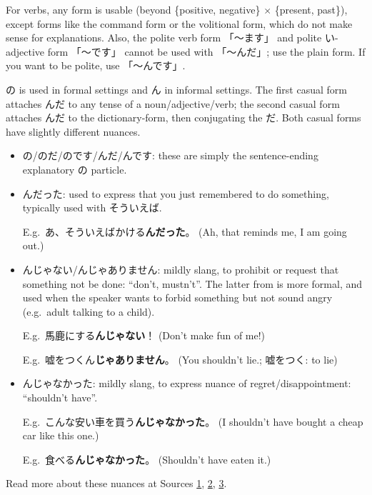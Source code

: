 \documentclass[../nihongo-gakushuu-kyouzai.tex]{subfiles}
\begin{document}
For verbs, any form is usable (beyond \{positive, negative\} $\times$ \{present, past\}), except forms like the command form or the volitional form, which do not make sense for explanations. Also, the polite verb form 「〜ます」 and polite い-adjective form 「〜です」 cannot be used with 「〜んだ」; use the plain form. If you want to be polite, use 「〜んです」.

の is used in formal settings and ん in informal settings. The first casual form attaches んだ to any tense of a noun/adjective/verb; the second casual form attaches んだ to the dictionary-form, then conjugating the だ. Both casual forms have slightly different nuances.

\begin{itemize}
    \item の/のだ/のです/んだ/んです: these are simply the sentence-ending explanatory の particle.
    \item んだった: used to express that you just remembered to do something, typically used with そういえば.

    E.g.\ あ、そういえばかける\textbf{んだった}。 (Ah, that reminds me, I am going out.)

    \item んじゃない/んじゃありません: mildly slang, to prohibit or request that something not be done: ``don't, mustn't''. The latter from is more formal, and used when the speaker wants to forbid something but not sound angry (e.g.\ adult talking to a child).

    E.g.\ 馬鹿にする\textbf{んじゃない}！ (Don't make fun of me!)

    E.g.\ 嘘をつくん\textbf{じゃありません}。 (You shouldn't lie.; 嘘をつく: to lie)

    \item んじゃなかった: mildly slang, to express nuance of regret/disappointment: ``shouldn't have''.

    E.g.\ こんな安い車を買う\textbf{んじゃなかった}。 (I shouldn't have bought a cheap car like this one.)

    E.g.\ 食べる\textbf{んじゃなかった}。 (Shouldn't have eaten it.)
\end{itemize}

Read more about these nuances at Sources \href{https://bunpro.jp/grammar_points/%E3%82%93%E3%81%98%E3%82%83%E3%81%AA%E3%81%84}{1}, \href{https://hinative.com/questions/9228841}{2}, \href{https://ja.hinative.com/questions/5027480}{3}.
\end{document}
